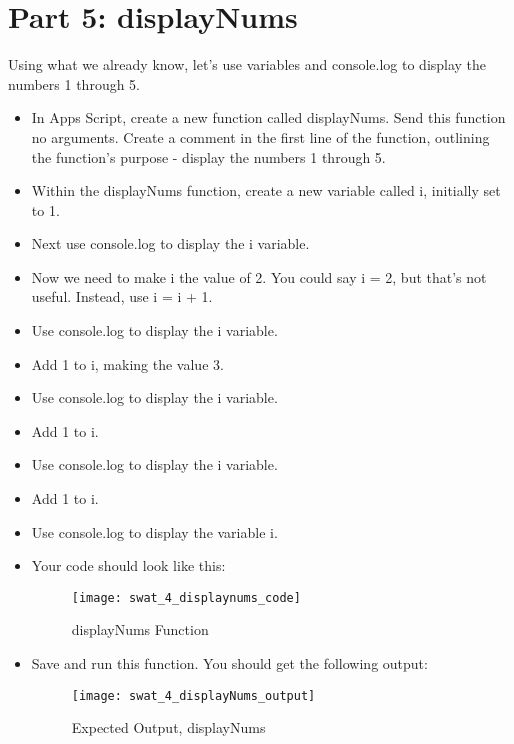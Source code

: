 \documentclass{article}
\begin{document}
\section*{Part 5:  displayNums}
Using what we already know, let's use variables and console.log to display the numbers 1 through 5.
\begin{itemize}
	\item In Apps Script, create a new function called displayNums.  Send this function no arguments.  Create a comment in the first line of the function, outlining the function's purpose - display the numbers 1 through 5.
	\item Within the displayNums function, create a new variable called i, initially set to 1.
	\item Next use console.log to display the i variable.
	\item Now we need to make i the value of 2.  You could say i = 2, but that's not useful.  Instead, use i = i + 1.
	\item Use console.log to display the i variable.
	\item Add 1 to i, making the value 3.
	\item Use console.log to display the i variable.
	\item Add 1 to i.
	\item Use console.log to display the i variable.
	\item Add 1 to i.
	\item Use console.log to display the variable i.
	\item Your code should look like this:
	\begin{figure}[H]
  		\centering
  		\texttt{[image: swat\_4\_displaynums\_code]}
  		\caption{displayNums Function}
	\end{figure}
	\item Save and run this function.  You should get the following output:
	\begin{figure}[H]
  		\centering
  		\texttt{[image: swat\_4\_displayNums\_output]}
  		\caption{Expected Output, displayNums}
	\end{figure}
\end{itemize}
\end{document}
